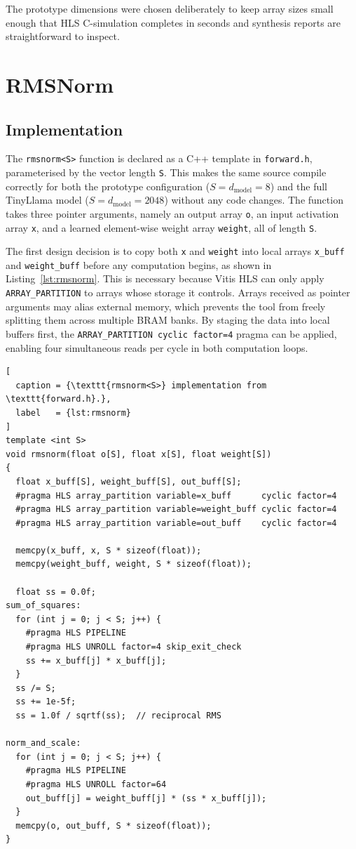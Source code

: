 The prototype dimensions were chosen deliberately to keep array sizes small
enough that HLS C-simulation completes in seconds and synthesis reports are
straightforward to inspect.
\section{RMSNorm}
\label{sec:rmsnorm_impl}

\subsection{Implementation}
\label{subsec:rmsnorm_impl}

The \texttt{rmsnorm<S>} function is declared as a C++ template in
\texttt{forward.h}, parameterised by the vector length \texttt{S}. This
makes the same source compile correctly for both the prototype configuration
($S = d_{\text{model}} = 8$) and the full TinyLlama model
($S = d_{\text{model}} = 2048$) without any code changes. The function
takes three pointer arguments, namely an output array \texttt{o}, an input
activation array \texttt{x}, and a learned element-wise weight array
\texttt{weight}, all of length \texttt{S}.

The first design decision is to copy both \texttt{x} and \texttt{weight}
into local arrays \texttt{x\_buff} and \texttt{weight\_buff} before any
computation begins, as shown in Listing~\ref{lst:rmsnorm}. This is
necessary because Vitis HLS can only apply \texttt{ARRAY\_PARTITION} to
arrays whose storage it controls. Arrays received as pointer arguments may
alias external memory, which prevents the tool from freely splitting them
across multiple BRAM banks. By staging the data into local buffers first,
the \texttt{ARRAY\_PARTITION cyclic factor=4} pragma can be applied,
enabling four simultaneous reads per cycle in both computation loops.

\begin{lstlisting}[
  caption = {\texttt{rmsnorm<S>} implementation from \texttt{forward.h}.},
  label   = {lst:rmsnorm}
]
template <int S>
void rmsnorm(float o[S], float x[S], float weight[S])
{
  float x_buff[S], weight_buff[S], out_buff[S];
  #pragma HLS array_partition variable=x_buff      cyclic factor=4
  #pragma HLS array_partition variable=weight_buff cyclic factor=4
  #pragma HLS array_partition variable=out_buff    cyclic factor=4

  memcpy(x_buff, x, S * sizeof(float));
  memcpy(weight_buff, weight, S * sizeof(float));

  float ss = 0.0f;
sum_of_squares:
  for (int j = 0; j < S; j++) {
    #pragma HLS PIPELINE
    #pragma HLS UNROLL factor=4 skip_exit_check
    ss += x_buff[j] * x_buff[j];
  }
  ss /= S;
  ss += 1e-5f;
  ss = 1.0f / sqrtf(ss);  // reciprocal RMS

norm_and_scale:
  for (int j = 0; j < S; j++) {
    #pragma HLS PIPELINE
    #pragma HLS UNROLL factor=64
    out_buff[j] = weight_buff[j] * (ss * x_buff[j]);
  }
  memcpy(o, out_buff, S * sizeof(float));
}
\end{lstlisting}

